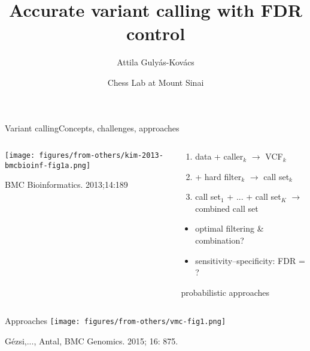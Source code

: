 \documentclass{beamer} %
\title{Accurate variant calling with FDR control}
\author{Attila Guly\'{a}s-Kov\'{a}cs}
\date{Chess Lab at Mount Sinai}
\begin{document}
\begin{frame}[plain, label=title]
\maketitle
\end{frame}

\begin{frame}{Variant calling}{Concepts, challenges, approaches}
\begin{columns}[t]
\begin{column}{0.5\textwidth}

\texttt{[image: figures/from-others/kim-2013-bmcbioinf-fig1a.png]}
\medskip

{\tiny BMC Bioinformatics. 2013;14:189}
\end{column}
\begin{column}{0.5\textwidth}
\begin{enumerate}
\item data + caller\(_k\) \(\rightarrow\) VCF\(_k\)
\item 
+ hard filter\(_k\) \(\rightarrow\) call set\(_k\)
\item<2-> call set\(_1\) + ... + call set\(_K\) \(\rightarrow\) combined call set
\end{enumerate}

\bigskip
{
\begin{itemize}
\item optimal filtering \& combination?
\item sensitivity--specificity: FDR = ?
\end{itemize}
}

\bigskip
{
\large
probabilistic approaches
}
\end{column}
\end{columns}
\end{frame}


\begin{frame}[label=approaches]{Approaches}
\texttt{[image: figures/from-others/vmc-fig1.png]}
\bigskip

{\footnotesize G\'{e}zsi,..., Antal, BMC Genomics. 2015; 16: 875.}
\end{frame}
\end{document}
